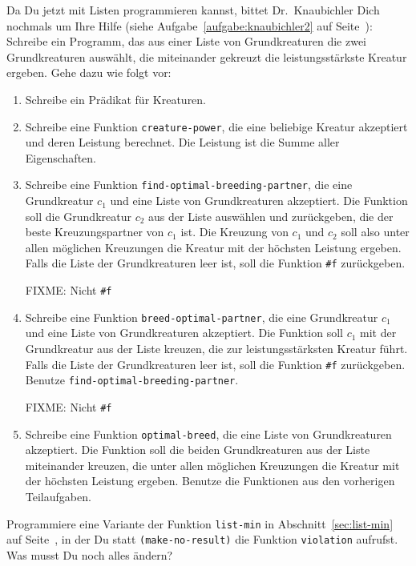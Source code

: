 \begin{aufgabe}
  Da Du jetzt mit Listen programmieren kannst, bittet Dr.~Knaubichler
  Dich nochmals um Ihre Hilfe (siehe Aufgabe~\ref{aufgabe:knaubichler2}
  auf Seite~\pageref{aufgabe:knaubichler2}):
  Schreibe ein Programm, das aus einer Liste von Grundkreaturen
  die zwei Grundkreaturen auswählt, die miteinander gekreuzt die
  leistungsstärkste Kreatur ergeben.
  Gehe dazu wie folgt vor:

  \begin{enumerate}
  \item Schreibe ein Prädikat für Kreaturen.

  \item Schreibe eine Funktion
    \lstinline{creature-power}, die eine beliebige Kreatur akzeptiert und
    deren Leistung berechnet.  Die Leistung ist die Summe aller
    Eigenschaften.

  \item  Schreibe eine Funktion
    \lstinline{find-optimal-breeding-partner}, die eine Grundkreatur
    $c_1$ und eine Liste von Grundkreaturen akzeptiert.  Die Funktion
    soll die Grundkreatur $c_2$ aus der Liste auswählen und
    zurückgeben, die der beste Kreuzungspartner von $c_1$ ist.  Die
    Kreuzung von $c_1$ und $c_2$ soll also unter allen möglichen
    Kreuzungen die Kreatur mit der höchsten Leistung ergeben.  Falls
    die Liste der Grundkreaturen leer ist, soll die Funktion \lstinline{#f}
    zurückgeben.

    FIXME: Nicht \lstinline{#f}
    
  \item  Schreibe eine Funktion
    \lstinline{breed-optimal-partner}, die eine Grundkreatur $c_1$ und
    eine Liste von Grundkreaturen akzeptiert.  Die Funktion soll $c_1$
    mit der Grundkreatur aus der Liste kreuzen, die zur
    leistungsstärksten Kreatur führt.  Falls die Liste der
    Grundkreaturen leer ist, soll die Funktion \lstinline{#f} zurückgeben.
    Benutze \lstinline{find-optimal-breeding-partner}.

    FIXME: Nicht \lstinline{#f}
    
  \item  Schreibe eine Funktion
    \lstinline{optimal-breed}, die eine Liste von Grundkreaturen
    akzeptiert.  Die Funktion soll die beiden Grundkreaturen aus der
    Liste miteinander kreuzen, die unter allen möglichen Kreuzungen
    die Kreatur mit der höchsten Leistung ergeben.  Benutze die
    Funktionen aus den vorherigen Teilaufgaben.

  \end{enumerate}
\end{aufgabe}

\begin{aufgabe}\label{aufgabe:list-min-violation}
  Programmiere eine Variante der Funktion \lstinline{list-min} in
  Abschnitt~\ref{sec:list-min} auf Seite~\pageref{sec:list-min}, in
  der Du statt \lstinline{(make-no-result)} die Funktion
  \lstinline{violation} aufrufst.  Was musst Du noch alles ändern?
\end{aufgabe}
